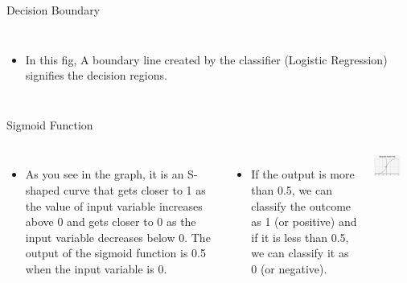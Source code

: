 \documentclass[aspectratio=169,14pt,usenames,dvipsnames]{beamer}
\begin{document}
 
\begin{frame}{Decision Boundary}
\begin{columns}
\begin{itemize}
  \item In this fig, A boundary line created by the classifier (Logistic Regression) signifies the decision regions.
\end{itemize}
\end{columns}
\end{frame}

\begin{frame}{Sigmoid Function}
\begin{columns}
\begin{itemize}
  \item As you see in the graph, it is an S-shaped curve that gets closer to 1 as the value of input variable increases above 0 and gets closer to 0 as the input variable decreases below 0. The output of the sigmoid function is 0.5 when the input variable is 0.
\end{itemize}
\begin{itemize}
\item If the output is more than 0.5, we can classify the outcome as 1 (or positive) and if it is less than 0.5, we can classify it as 0 (or negative).
\end{itemize}
\includegraphics[width=0.7\textwidth, height=0.5\textheight]{Images/AIML_LR_IMG4.png}
\end{columns}
\end{frame}
\end{document}
